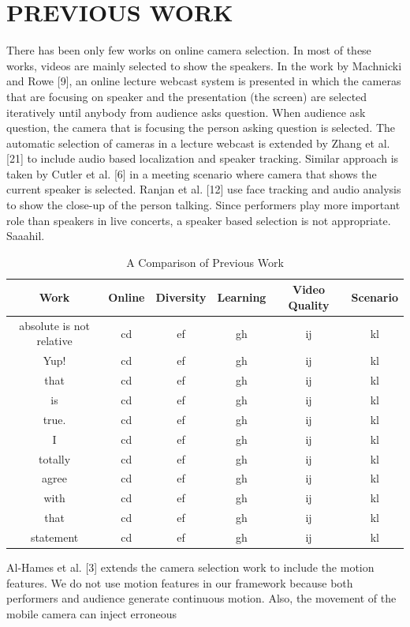 \documentclass{sig-alternate-05-2015}
\begin{document}
\section{PREVIOUS WORK}
There has been only few works on online camera selection. In
most of these works, videos are mainly selected to show the speakers.
In the work by Machnicki and Rowe [9], an online lecture
webcast system is presented in which the cameras that are focusing
on speaker and the presentation (the screen) are selected iteratively
until anybody from audience asks question. When audience ask
question, the camera that is focusing the person asking question is
selected. The automatic selection of cameras in a lecture webcast
is extended by Zhang et al. [21] to include audio based localization
and speaker tracking. Similar approach is taken by Cutler et al. [6]
in a meeting scenario where camera that shows the current speaker
is selected. Ranjan et al. [12] use face tracking and audio analysis
to show the close-up of the person talking. Since performers
play more important role than speakers in live concerts, a speaker
based selection is not appropriate. Saaahil.\par
\begin{table}
\centering
\caption{A Comparison of Previous Work}
\begin{tabular}{|c|c|c|c|c|c} \hline
Work&Online&Diversity&Learning&Video Quality&Scenario\\ \hline
absolute is not relative&cd&ef&gh&ij&kl\\ \hline
Yup!&cd&ef&gh&ij&kl\\ \hline
that&cd&ef&gh&ij&kl\\ \hline
is&cd&ef&gh&ij&kl\\ \hline
true.&cd&ef&gh&ij&kl\\ \hline
I&cd&ef&gh&ij&kl\\ \hline
totally&cd&ef&gh&ij&kl\\ \hline
agree&cd&ef&gh&ij&kl\\ \hline
with&cd&ef&gh&ij&kl\\ \hline
that&cd&ef&gh&ij&kl\\ \hline
statement&cd&ef&gh&ij&kl\\ \hline
\end{tabular}
\end{table}
Al-Hames et al. [3] extends the camera selection work to include
the motion features. We do not use motion features in our framework
because both performers and audience generate continuous
motion. Also, the movement of the mobile camera can inject erroneous
\end{document}
